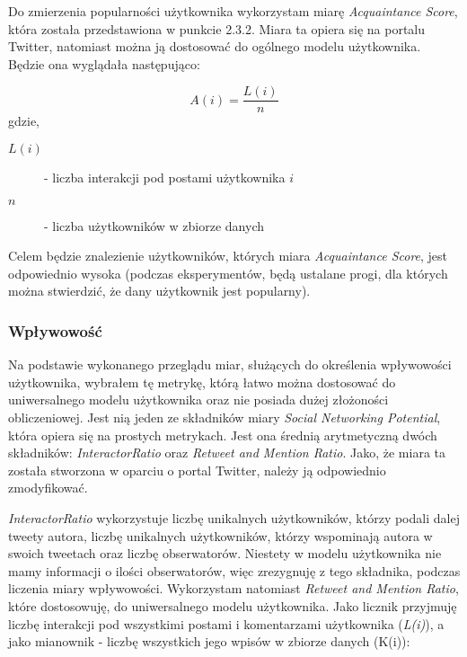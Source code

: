 \documentclass[polish,12pt]{aghthesis}
\begin{document}
Do zmierzenia popularności użytkownika wykorzystam miarę \textit{Acquaintance Score}, która została przedstawiona w punkcie 2.3.2. Miara ta opiera się na portalu Twitter, natomiast można ją dostosować do ogólnego modelu użytkownika. Będzie ona wyglądała następująco: 

\begin{equation}
    A(i) = \frac{L(i)}{n} \label{n17}
\end{equation}
gdzie,
\begin{description}
\item[$L(i)$] - liczba interakcji pod postami użytkownika $i$
\item[$n$] - liczba użytkowników w zbiorze danych
\end{description}


Celem będzie znalezienie użytkowników, których miara \textit{Acquaintance Score}, jest odpowiednio wysoka (podczas eksperymentów, będą ustalane progi, dla których można stwierdzić, że dany użytkownik jest popularny).


\subsubsection{Wpływowość}

Na podstawie wykonanego przeglądu miar, służących do określenia wpływowości użytkownika, wybrałem tę metrykę, którą łatwo można dostosować do uniwersalnego modelu użytkownika oraz nie posiada dużej złożoności obliczeniowej. Jest nią jeden ze składników miary \textit{Social Networking Potential}, która opiera się na prostych metrykach. Jest ona średnią arytmetyczną dwóch składników: \textit{InteractorRatio} oraz \textit{Retweet and Mention Ratio}. Jako, że miara ta została stworzona w oparciu o portal Twitter, należy ją odpowiednio zmodyfikować.

\vspace{5mm}

\textit{InteractorRatio} wykorzystuje liczbę unikalnych użytkowników, którzy podali dalej tweety autora, liczbę unikalnych użytkowników, którzy wspominają autora w swoich tweetach oraz liczbę obserwatorów. Niestety w modelu użytkownika nie mamy informacji o ilości obserwatorów, więc zrezygnuję z tego składnika, podczas liczenia miary wpływowości. Wykorzystam natomiast \textit{Retweet and Mention Ratio}, które dostosowuję, do uniwersalnego modelu użytkownika. Jako licznik przyjmuję liczbę interakcji pod wszystkimi postami i komentarzami użytkownika (\textit{L(i)}), a jako mianownik - liczbę wszystkich jego wpisów w zbiorze danych (K(i)):
\end{document}
